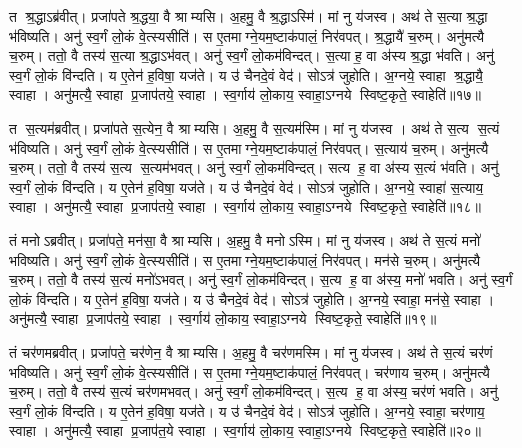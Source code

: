    त श्र॒द्धाऽब्र॑वीत्।
   प्रजा॑पते श्र॒द्धया॒ वै श्राम्यसि।
   अ॒हमु॒ वै श्र॒द्धाऽस्मि॑।
   मां नु य॑जस्व।
   अथ॑ ते स॒त्या श्र॒द्धा भ॑विष्यति।
   अनु॑ स्व॒र्गं लो॒कं वे॒त्स्यसीति॑।
   स ए॒तमाग्ने॒यम॒ष्टाक॑पालं॒ निर॑वपत्।
   श्र॒द्धायै॑ च॒रुम्।
   अनु॑मत्यै च॒रुम्।
   ततो॒ वै तस्य॑ स॒त्या श्र॒द्धाऽभ॑वत्।
   अनु॑ स्व॒र्गं लो॒कम॑विन्दत्।
   स॒त्या ह॒ वा अ॑स्य श्र॒द्धा भ॑वति।
   अनु॑ स्व॒र्गं लो॒कं वि॑न्दति।
   य ए॒तेन॑ ह॒विषा॒ यज॑ते।
   य उ॑ चैनदे॒वं वेद॑।
   सोऽत्र॑ जुहोति।
   अ॒ग्नये॒ स्वाहा श्र॒द्धायै॒ स्वाहा।
   अनु॑मत्यै॒ स्वाहा प्र॒जाप॑तये॒ स्वाहा।
   स्व॒र्गाय॑ लो॒काय॒ स्वाहा॒ऽग्नये स्विष्ट॒कृते॒ स्वाहेति॑॥१७॥

   त स॒त्यम॑ब्रवीत्।
   प्रजा॑पते स॒त्येन॒ वै श्राम्यसि।
   अ॒हमु॒ वै स॒त्यम॑स्मि।
   मां नु य॑जस्व ।
   अथ॑ ते स॒त्य स॒त्यं भ॑विष्यति।
   अनु॑ स्व॒र्गं लो॒कं वे॒त्स्यसीति॑।
   स ए॒तमाग्ने॒यम॒ष्टाक॑पालं॒ निर॑वपत्।
   स॒त्याय॑ च॒रुम्।
   अनु॑मत्यै च॒रुम्।
   ततो॒ वै तस्य॑ स॒त्य स॒त्यम॑भवत्।
   अनु॑ स्व॒र्गं लो॒कम॑विन्दत्।
   सत्य ह॒ वा अ॑स्य स॒त्यं भ॑वति।
   अनु॑ स्व॒र्गं लो॒कं वि॑न्दति।
   य ए॒तेन॑ ह॒विषा॒ यज॑ते।
   य उ॑ चैनदे॒वं वेद॑।
   सोऽत्र॑ जुहोति।
   अ॒ग्नये॒ स्वाहा॑ स॒त्याय॒ स्वाहा।
   अनु॑मत्यै॒ स्वाहा प्र॒जाप॑तये॒ स्वाहा।
   स्व॒र्गाय॑ लो॒काय॒ स्वाहा॒ऽग्नये स्विष्ट॒कृते॒ स्वाहेति॑॥१८॥

   तं मनोऽब्रवीत्।
   प्रजा॑पते॒ मन॑सा॒ वै श्राम्यसि।
   अ॒हमु॒ वै मनोऽस्मि।
   मां नु य॑जस्व।
   अथ॑ ते स॒त्यं मनो॑ भविष्यति।
   अनु॑ स्व॒र्गं लो॒कं वे॒त्स्यसीति॑।
   स ए॒तमाग्ने॒यम॒ष्टाक॑पालं॒ निर॑वपत्।
   मन॑से च॒रुम्।
   अनु॑मत्यै च॒रुम्।
   ततो॒ वै तस्य॑ स॒त्यं मनो॑ऽभवत्।
   अनु॑ स्व॒र्गं लो॒कम॑विन्दत्।
   स॒त्य ह॒ वा अ॑स्य॒ मनो॑ भवति।
   अनु॑ स्व॒र्गं लो॒कं वि॑न्दति।
   य ए॒तेन॑ ह॒विषा॒ यज॑ते।
   य उ॑ चैनदे॒वं वेद॑।
   सोऽत्र॑ जुहोति।
   अ॒ग्नये॒ स्वाहा॒ मन॑से॒ स्वाहा।
   अनु॑मत्यै॒ स्वाहा प्र॒जाप॑तये॒ स्वाहा।
   स्व॒र्गाय॑ लो॒काय॒ स्वाहा॒ऽग्नये स्विष्ट॒कृते॒ स्वाहेति॑॥१९॥

   तं चर॑णमब्रवीत्।
   प्रजा॑पते॒ चर॑णेन॒ वै श्राम्यसि।
   अ॒हमु॒ वै चर॑णमस्मि।
   मां नु य॑जस्व।
   अथ॑ ते स॒त्यं चर॑णं भविष्यति।
   अनु॑ स्व॒र्गं लो॒कं वे॒त्स्यसीति॑।
   स ए॒तमाग्ने॒यम॒ष्टाक॑पालं॒ निर॑वपत्।
   चर॑णाय च॒रुम्।
   अनु॑मत्यै च॒रुम्।
   ततो॒ वै तस्य॑ स॒त्यं चर॑णमभवत्।
   अनु॑ स्व॒र्गं लो॒कम॑विन्दत्।
   स॒त्य ह॒ वा अ॑स्य॒ चर॑णं भवति।
   अनु॑ स्व॒र्गं लो॒कं वि॑न्दति।
   य ए॒तेन॑ ह॒विषा॒ यज॑ते।
   य उ॑ चैनदे॒वं वेद॑।
   सोऽत्र॑ जुहोति।
   अ॒ग्नये॒ स्वाहा॒ चर॑णाय॒ स्वाहा।
   अनु॑मत्यै॒ स्वाहा प्र॒जाप॑त॒ये स्वाहा।
   स्व॒र्गाय॑ लो॒काय॒ स्वाहा॒ऽग्नये स्विष्ट॒कृते॒ स्वाहेति॑॥२०॥

